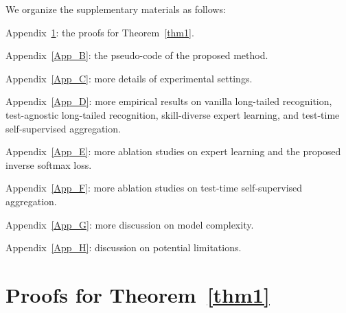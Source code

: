 \documentclass{article}
\begin{document}
		 
We organize the supplementary materials as follows:

 Appendix~\ref{App_A}: the proofs for Theorem~\ref{thm1}.

 Appendix~\ref{App_B}: the pseudo-code of the proposed method. 

 Appendix~\ref{App_C}: more details of experimental settings. 

 Appendix~\ref{App_D}:    more empirical results on vanilla long-tailed recognition, test-agnostic long-tailed recognition, skill-diverse expert learning, and test-time self-supervised aggregation. 
 

 Appendix~\ref{App_E}:    more ablation studies   on  expert learning and the proposed inverse softmax loss. 
  
 Appendix~\ref{App_F}:    more ablation studies   on  test-time self-supervised aggregation.  

 Appendix~\ref{App_G}:    more discussion   on  model complexity.  

 Appendix~\ref{App_H}:    discussion on potential limitations.  
 
\section{Proofs for Theorem~\ref{thm1}}\label{App_A}
  
\end{document}

